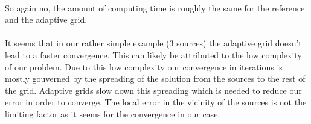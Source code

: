 \\
So again no, the amount of computing time is roughly the same for the reference and the adaptive grid.\\

\\
It seems that in our rather simple example (3 sources) the adaptive grid doesn't lead to a faster convergence. This can likely be attributed to the low complexity of our problem. Due to this low complexity our convergence in iterations is mostly gouverned by the spreading of the solution from the sources to the rest of the grid. Adaptive grids slow down this spreading which is needed to reduce our error in order to converge. The local error in the vicinity of the sources is not the limiting factor as it seems for the convergence in our case.\\


